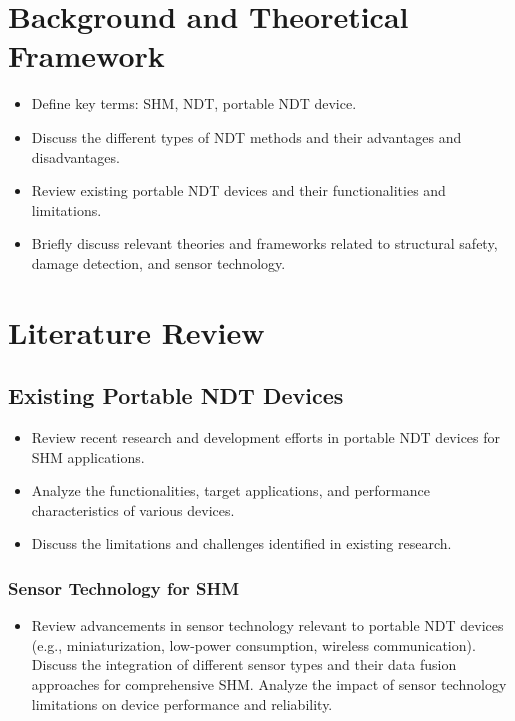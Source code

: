 \documentclass[journal, a4paper]{IEEEtran}
\begin{document}
\section{Background and Theoretical Framework}
\begin{itemize}
  \item Define key terms: SHM, NDT, portable NDT device.
  \item Discuss the different types of NDT methods and their advantages and disadvantages.
  \item Review existing portable NDT devices and their functionalities and limitations.
  \item Briefly discuss relevant theories and frameworks related to structural safety, damage detection, and sensor technology.
\end{itemize}


\section{Literature Review}

\subsection{Existing Portable NDT Devices}
\begin{itemize}
  \item Review recent research and development efforts in portable NDT devices for SHM applications.
  \item Analyze the functionalities, target applications, and performance characteristics of various devices.
  \item Discuss the limitations and challenges identified in existing research.
\end{itemize}

\subsubsection{Sensor Technology for SHM}
\begin{itemize}
  \item Review advancements in sensor technology relevant to portable NDT devices (e.g., miniaturization, low-power consumption, wireless communication).
  Discuss the integration of different sensor types and their data fusion approaches for comprehensive SHM.
  Analyze the impact of sensor technology limitations on device performance and reliability.
\end{itemize}
\end{document}
